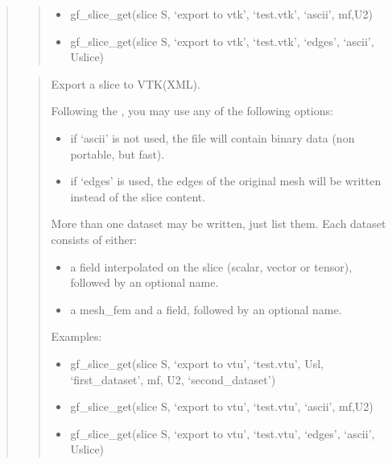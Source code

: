 \documentclass[a4paper,11pt,english]{sphinxmanual}
\begin{document}
\begin{quote}
\begin{quote}
\begin{itemize}
\item {} 
\sphinxAtStartPar
gf\_slice\_get(slice S, ‘export to vtk’, ‘test.vtk’, ‘ascii’, mf,U2)

\item {} 
\sphinxAtStartPar
gf\_slice\_get(slice S, ‘export to vtk’, ‘test.vtk’, ‘edges’, ‘ascii’, Uslice)

\end{itemize}
\end{quote}

\sphinxAtStartPar
{}
\begin{quote}

\sphinxAtStartPar
Export a slice to VTK(XML).

\sphinxAtStartPar
Following the , you may use any of the following options:
\begin{itemize}
\item {} 
\sphinxAtStartPar
if ‘ascii’ is not used, the file will contain binary data
(non portable, but fast).

\item {} 
\sphinxAtStartPar
if ‘edges’ is used, the edges of the original mesh will be
written instead of the slice content.

\end{itemize}

\sphinxAtStartPar
More than one dataset may be written, just list them. Each dataset
consists of either:
\begin{itemize}
\item {} 
\sphinxAtStartPar
a field interpolated on the slice (scalar, vector or tensor),
followed by an optional name.

\item {} 
\sphinxAtStartPar
a mesh\_fem and a field, followed by an optional name.

\end{itemize}

\sphinxAtStartPar
Examples:
\begin{itemize}
\item {} 
\sphinxAtStartPar
gf\_slice\_get(slice S, ‘export to vtu’, ‘test.vtu’, Usl, ‘first\_dataset’, mf,
U2, ‘second\_dataset’)

\item {} 
\sphinxAtStartPar
gf\_slice\_get(slice S, ‘export to vtu’, ‘test.vtu’, ‘ascii’, mf,U2)

\item {} 
\sphinxAtStartPar
gf\_slice\_get(slice S, ‘export to vtu’, ‘test.vtu’, ‘edges’, ‘ascii’, Uslice)


\end{itemize}
\end{quote}
\end{quote}
\end{document}
